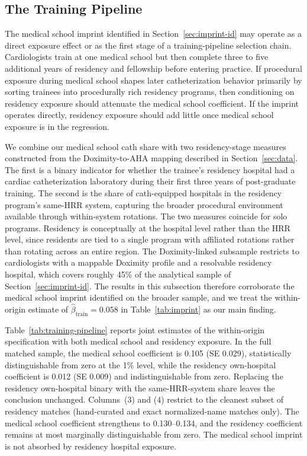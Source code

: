 \documentclass[12pt]{article}
\begin{document}
\subsection{The Training Pipeline}\label{sec:training-pipeline}

The medical school imprint identified in Section~\ref{sec:imprint-id} may operate as a direct exposure effect or as the first stage of a training-pipeline selection chain. Cardiologists train at one medical school but then complete three to five additional years of residency and fellowship before entering practice. If procedural exposure during medical school shapes later catheterization behavior primarily by sorting trainees into procedurally rich residency programs, then conditioning on residency exposure should attenuate the medical school coefficient. If the imprint operates directly, residency exposure should add little once medical school exposure is in the regression.

We combine our medical school cath share with two residency-stage measures constructed from the Doximity-to-AHA mapping described in Section~\ref{sec:data}. The first is a binary indicator for whether the trainee's residency hospital had a cardiac catheterization laboratory during their first three years of post-graduate training. The second is the share of cath-equipped hospitals in the residency program's same-HRR system, capturing the broader procedural environment available through within-system rotations. The two measures coincide for solo programs. Residency is conceptually at the hospital level rather than the HRR level, since residents are tied to a single program with affiliated rotations rather than rotating across an entire region. The Doximity-linked subsample restricts to cardiologists with a mappable Doximity profile and a resolvable residency hospital, which covers roughly 45\% of the analytical sample of Section~\ref{sec:imprint-id}. The results in this subsection therefore corroborate the medical school imprint identified on the broader sample, and we treat the within-origin estimate of $\hat\beta_{\text{train}} = 0.058$ in Table~\ref{tab:imprint} as our main finding.

Table~\ref{tab:training-pipeline} reports joint estimates of the within-origin specification with both medical school and residency exposure. In the full matched sample, the medical school coefficient is 0.105 (SE 0.029), statistically distinguishable from zero at the 1\% level, while the residency own-hospital coefficient is 0.012 (SE 0.009) and indistinguishable from zero. Replacing the residency own-hospital binary with the same-HRR-system share leaves the conclusion unchanged. Columns~(3) and (4) restrict to the cleanest subset of residency matches (hand-curated and exact normalized-name matches only). The medical school coefficient strengthens to 0.130--0.134, and the residency coefficient remains at most marginally distinguishable from zero. The medical school imprint is not absorbed by residency hospital exposure.
\end{document}
